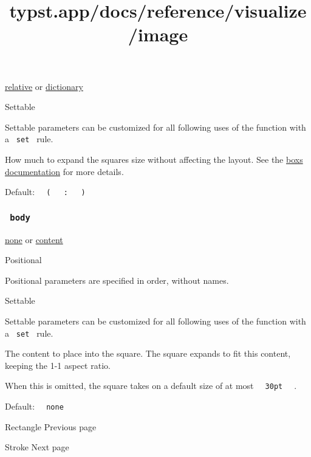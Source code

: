 \href{/docs/reference/layout/relative/}{relative} {or}
\href{/docs/reference/foundations/dictionary/}{dictionary}

{{ Settable }}

\label{parameters-outset-settable-tooltip}
Settable parameters can be customized for all following uses of the
function with a \texttt{\ set\ } rule.

How much to expand the square\textquotesingle s size without affecting
the layout. See the
\href{/docs/reference/layout/box/\#parameters-outset}{box\textquotesingle s
documentation} for more details.

Default:
\texttt{\ }{\texttt{\ (\ }}\texttt{\ }{\texttt{\ :\ }}\texttt{\ }{\texttt{\ )\ }}\texttt{\ }

\subsubsection{\texorpdfstring{\texttt{\ body\ }}{ body }}\label{parameters-body}

\href{/docs/reference/foundations/none/}{none} {or}
\href{/docs/reference/foundations/content/}{content}

{{ Positional }}

\label{parameters-body-positional-tooltip}
Positional parameters are specified in order, without names.

{{ Settable }}

\label{parameters-body-settable-tooltip}
Settable parameters can be customized for all following uses of the
function with a \texttt{\ set\ } rule.

The content to place into the square. The square expands to fit this
content, keeping the 1-1 aspect ratio.

When this is omitted, the square takes on a default size of at most
\texttt{\ }{\texttt{\ 30pt\ }}\texttt{\ } .

Default: \texttt{\ }{\texttt{\ none\ }}\texttt{\ }

\href{/docs/reference/visualize/rect/}{\pandocbounded{}}

{ Rectangle } { Previous page }

\href{/docs/reference/visualize/stroke/}{\pandocbounded{}}

{ Stroke } { Next page }


\title{typst.app/docs/reference/visualize/image}

